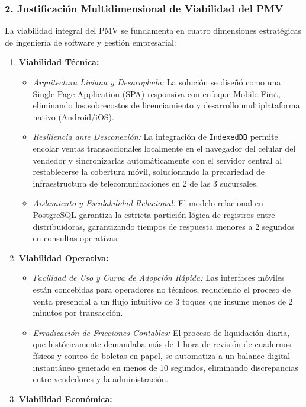 \subsubsection*{\color{mauve} 2. Justificación Multidimensional de Viabilidad del PMV}
\noindent La viabilidad integral del PMV se fundamenta en cuatro dimensiones estratégicas de ingeniería de software y gestión empresarial:
\begin{enumerate}
    \item \textbf{Viabilidad Técnica:}
    \begin{itemize}
        \item \textit{Arquitectura Liviana y Desacoplada:} La solución se diseñó como una Single Page Application (SPA) responsiva con enfoque Mobile-First, eliminando los sobrecostos de licenciamiento y desarrollo multiplataforma nativo (Android/iOS).
        \item \textit{Resiliencia ante Desconexión:} La integración de \texttt{IndexedDB} permite encolar ventas transaccionales localmente en el navegador del celular del vendedor y sincronizarlas automáticamente con el servidor central al restablecerse la cobertura móvil, solucionando la precariedad de infraestructura de telecomunicaciones en 2 de las 3 sucursales.
        \item \textit{Aislamiento y Escalabilidad Relacional:} El modelo relacional en PostgreSQL garantiza la estricta partición lógica de registros entre distribuidoras, garantizando tiempos de respuesta menores a 2 segundos en consultas operativas.
    \end{itemize}
    \item \textbf{Viabilidad Operativa:}
    \begin{itemize}
        \item \textit{Facilidad de Uso y Curva de Adopción Rápida:} Las interfaces móviles están concebidas para operadores no técnicos, reduciendo el proceso de venta presencial a un flujo intuitivo de 3 toques que insume menos de 2 minutos por transacción.
        \item \textit{Erradicación de Fricciones Contables:} El proceso de liquidación diaria, que históricamente demandaba más de 1 hora de revisión de cuadernos físicos y conteo de boletas en papel, se automatiza a un balance digital instantáneo generado en menos de 10 segundos, eliminando discrepancias entre vendedores y la administración.
    \end{itemize}
    \item \textbf{Viabilidad Económica:}

\end{enumerate}

